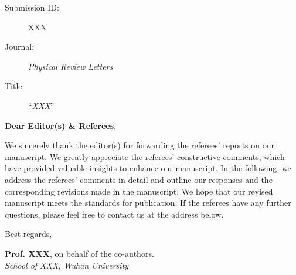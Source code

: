 \begin{description}
\item[Submission ID:] XXX
\item[Journal:] \textit{Physical Review Letters}
\item[Title:] ``\textit{XXX}''
\end{description}

\noindent
\textbf{Dear Editor(s) \& Referees},

We sincerely thank the editor(s) for forwarding the referees' reports on our manuscript. We greatly appreciate the referees' constructive comments, which have provided valuable insights to enhance our manuscript. In the following, we address the referees' comments in detail and outline our responses and the corresponding revisions made in the manuscript. We hope that our revised manuscript meets the standards for publication.
If the referees have any further questions, please feel free to contact us at the address below.

Best regards,
\begin{flushright}
	\textbf{Prof. XXX}, on behalf of the co-authors.\\
	\textit{School of XXX, Wuhan University}
\end{flushright}